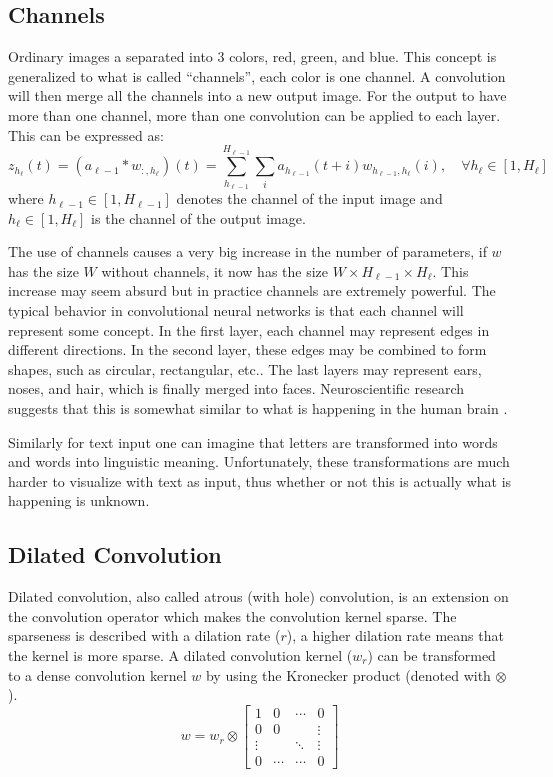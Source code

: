 \subsection{Channels}
Ordinary images a separated into 3 colors, red, green, and blue. This concept is generalized to what is called ``channels'', each color is one channel. A convolution will then merge all the channels into a new output image. For the output to have more than one channel, more than one convolution can be applied to each layer. This can be expressed as:
\begin{equation}
z_{h_\ell}(t) = (a_{\ell-1} * w_{:, h_\ell})(t) = \sum_{h_{\ell-1}}^{H_{\ell-1}} \sum_{i} a_{h_{\ell-1}}(t + i) w_{h_{\ell-1}, h_\ell}(i), \quad \forall h_\ell \in [1, H_\ell]
\end{equation}
where $h_{\ell-1} \in [1, H_{\ell-1}]$ denotes the channel of the input image and $h_\ell \in [1, H_\ell]$ is the channel of the output image.

The use of channels causes a very big increase in the number of parameters, if $w$ has the size $W$ without channels, it now has the size $W \times H_{\ell-1} \times H_\ell$. This increase may seem absurd but in practice channels are extremely powerful. The typical behavior in convolutional neural networks is that each channel will represent some concept. In the first layer, each channel may represent edges in different directions. In the second layer, these edges may be combined to form shapes, such as circular, rectangular, etc.. The last layers may represent ears, noses, and hair, which is finally merged into faces. Neuroscientific research suggests that this is somewhat similar to what is happening in the human brain \cite[chapter 9.10]{deep-learning}.

Similarly for text input one can imagine that letters are transformed into words and words into linguistic meaning. Unfortunately, these transformations are much harder to visualize with text as input, thus whether or not this is actually what is happening is unknown.

\subsection{Dilated Convolution}

Dilated convolution, also called atrous (with hole) convolution, is an extension on the convolution operator which makes the convolution kernel sparse. The sparseness is described with a dilation rate ($r$), a higher dilation rate means that the kernel is more sparse. A dilated convolution kernel ($w_r$) can be transformed to a dense convolution kernel $w$ by using the Kronecker product (denoted with $\otimes$).
\begin{equation}
w = w_r \otimes \begin{bmatrix}
1      & 0      & \cdots & 0      \\
0      & 0      &        & \vdots \\
\vdots &        & \ddots & \vdots \\
0      & \cdots & \cdots & 0
\end{bmatrix}
\end{equation}

